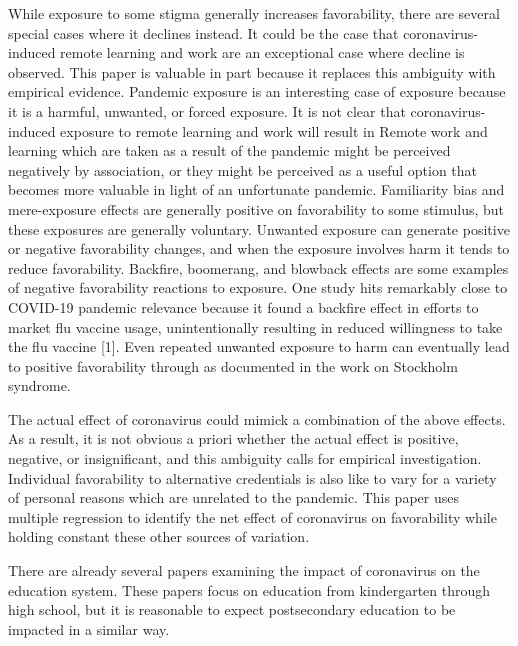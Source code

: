 \documentclass[review]{elsarticle}
\begin{document}
While exposure to some stigma generally increases favorability, there are several special cases where it declines instead.
It could be the case that coronavirus-induced remote learning and work are an exceptional case where decline is observed.
This paper is valuable in part because it replaces this ambiguity with empirical evidence.
Pandemic exposure is an interesting case of exposure because it is a harmful, unwanted, or forced exposure.
It is not clear that coronavirus-induced exposure to remote learning and work will result in
Remote work and learning which are taken as a result of the pandemic might be perceived negatively by association,
or they might be perceived as a useful option that becomes more valuable in light of an unfortunate pandemic.
Familiarity bias and mere-exposure effects are generally positive on favorability to some stimulus,
but these exposures are generally voluntary. Unwanted exposure can generate positive or negative favorability changes,
and when the exposure involves harm it tends to reduce favorability.
Backfire, boomerang, and blowback effects are some examples of negative favorability reactions to exposure.
One study hits remarkably close to COVID-19 pandemic relevance because it found a backfire effect in efforts to market flu vaccine usage,
unintentionally resulting in reduced willingness to take the flu vaccine [1].
Even repeated unwanted exposure to harm can eventually lead to positive favorability through as documented in the work on Stockholm syndrome.

The actual effect of coronavirus could mimick a combination of the above effects.
As a result, it is not obvious a priori whether the actual effect is positive, negative, or insignificant,
and this ambiguity calls for empirical investigation.
Individual favorability to alternative credentials is also like to vary for a variety of personal reasons which are unrelated to the pandemic.
This paper uses multiple regression to identify the net effect of coronavirus on favorability while holding constant these other sources of variation.


There are already several papers examining the impact of coronavirus on the education system.
These papers focus on education from kindergarten through high school,
but it is reasonable to expect postsecondary education to be impacted in a similar way.
\end{document}
